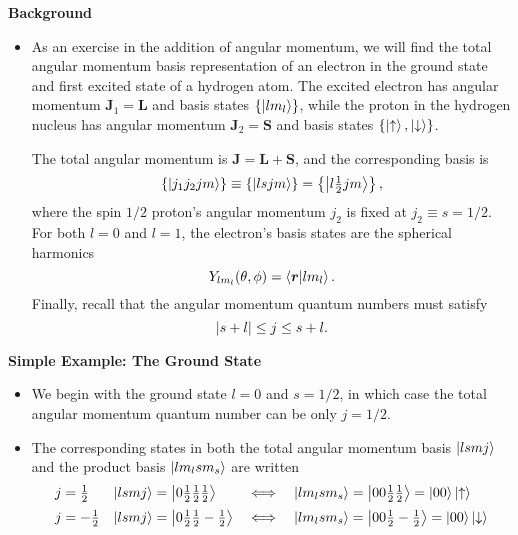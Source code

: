 \documentclass[11pt, a4paper]{article}
\renewcommand{\vec}[1]{\bm{#1}}  %
\newcommand{\ua}{\uparrow}  %
\newcommand{\da}{\downarrow}  %
\renewcommand{\r}{\vec{r}}  %
\renewcommand{\L}{\vec{L}}  %
\renewcommand{\S}{\vec{S}}  %
\newcommand{\J}{\vec{J}}  %
\begin{document}
\textbf{Background}
\begin{itemize}
    \item As an exercise in the addition of angular momentum, we will find the total angular momentum basis representation of an electron in the ground state and first excited state of a hydrogen atom. The excited electron has angular momentum $ \J_{1} = \L $ and basis states $ \{\ket{lm_{l}}\} $, while the proton in the hydrogen nucleus has angular momentum $ \J_{2} = \S $ and basis states $ \{\ket{\ua}, \ket{\da}\} $. 

    The total angular momentum is $ \J = \L + \S $, and the corresponding basis is
    \begin{equation*}
        \{ \ket{j_{1}j_{2}jm} \} \equiv \{\ket{lsjm}\} = \left\{ \ket{l \tfrac{1}{2}jm} \right\},
    \end{equation*}
    where the spin $ 1/2 $ proton's angular momentum $ j_{2} $ is fixed at $ j_{2} \equiv s = 1/2 $. For both $ l = 0 $ and $ l= 1 $, the electron's basis states are the spherical harmonics
    \begin{equation*}
        Y_{lm_{l}}(\theta, \phi) = \braket{\r}{lm_{l}}.
    \end{equation*}
    Finally, recall that the angular momentum quantum numbers must satisfy
    \begin{equation*}
        \abs{s + l} \leq j \leq s + l.
    \end{equation*}
    
\end{itemize}

\textbf{Simple Example: The Ground State}
\begin{itemize}
    \item We begin with the ground state $ l = 0 $ and $ s = 1/2 $, in which case the total angular momentum quantum number can be only $ j = 1/2 $. 

    \item The corresponding states in both the total angular momentum basis $ \ket{lsmj} $ and the product basis $ \ket{lm_{l}sm_{s}} $ are written
    \begin{equation*}
        \begin{array}{llcl}
            j = \tfrac{1}{2} & \ket{ls mj} = \ket{0 \tfrac{1}{2} \tfrac{1}{2} \tfrac{1}{2}} & \iff & \ket{lm_{l}sm_{s}} = \ket{00 \tfrac{1}{2} \tfrac{1}{2}} = \ket{00}\ket{\ua}\\[2mm]
            j = - \tfrac{1}{2} & \ket{lsmj} = \ket{0 \tfrac{1}{2} \tfrac{1}{2} -\tfrac{1}{2}} & \iff & \ket{lm_{l}sm_{s}} = \ket{0 0 \tfrac{1}{2} -\tfrac{1}{2}} = \ket{00}\ket{\da}
        \end{array}
    \end{equation*}
    
\end{itemize}
\end{document}
